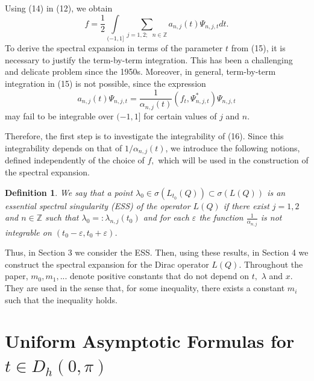 \documentclass{article}%
\newtheorem{definition}{Definition}
\begin{document}
Using (14) in (12), we obtain
\begin{equation}
f=\frac{1}{2}\int\limits_{(-1,1]}\sum_{j=1,2;\text{ }n\in\mathbb{Z}}%
a_{n,j}(t)\Psi_{n,j,t}dt. \tag{15}%
\end{equation}
To derive the spectral expansion in terms of the parameter $t$ from (15), it
is necessary to justify the term-by-term integration. This has been a
challenging and delicate problem since the 1950s. Moreover, in general,
term-by-term integration in (15) is not possible, since the expression
\begin{equation}
a_{n,j}(t)\Psi_{n,j,t}=\frac{1}{\alpha_{n,j}(t)}(f_{t},\Psi_{n,j,t}^{\ast
})\Psi_{n,j,t} \tag{16}%
\end{equation}
may fail to be integrable over $(-1,1]$ for certain values of $j$ and $n.$

Therefore, the first step is to investigate the integrability of (16). Since
this integrability depends on that of $1/\alpha_{n,j}(t)$, we introduce the
following notions, defined independently of the choice of $f,$ which will be
used in the construction of the spectral expansion.

\begin{definition}
We say that a point $\lambda_{0}\in\sigma(L_{t_{0}}(Q))\subset\sigma(L(Q))$ is
an essential spectral singularity (ESS) of the operator $L(Q)$ if there exist
$j=1,2$ and $n\in\mathbb{Z}$ such that $\lambda_{0}=:\lambda_{n,j}(t_{0})$ and
for each $\varepsilon$ the function $\frac{1}{\alpha_{n,j}}$ is not integrable
on $(t_{0}-\varepsilon,t_{0}+\varepsilon)$.
\end{definition}

Thus, in Section 3 we consider the ESS. Then, using these results, in Section
4 we construct the spectral expansion for the Dirac operator $L(Q).$
Throughout the paper, $m_{0},m_{1},...$ denote positive constants that do not
depend on $t,$ $\lambda$ and $x.$ They are used in the sense that, for some
inequality, there exists a constant $m_{i}$ such that the inequality holds.

\section{Uniform Asymptotic Formulas for $t\in D_{h}(0,\pi)$}
\end{document}
